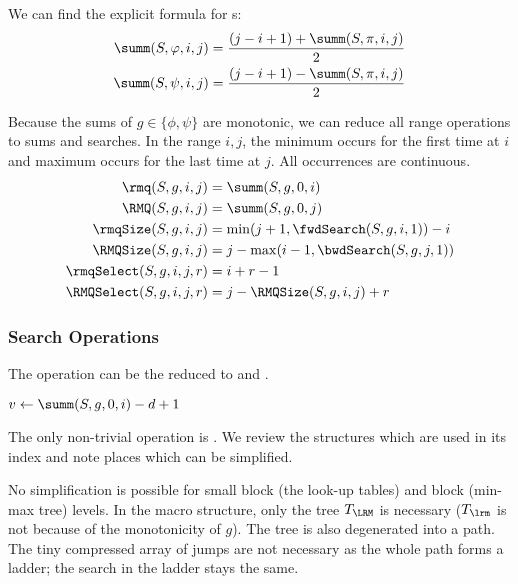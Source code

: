 We can find the explicit formula for \summ{}s:
\begin{align*}
	\summ(S, \phi, i, j) &= \frac{(j - i + 1) + \summ(S, \pi, i, j)}{2} \\
	\summ(S, \psi, i, j) &= \frac{(j - i + 1) - \summ(S, \pi, i, j)}{2}
\end{align*}

Because the sums of $g \in \{\phi, \psi \}$ are monotonic, we can reduce all range operations to sums and searches.
In the range $i, j$, the minimum occurs for the first time at $i$ and maximum occurs for the last time at $j$.
All occurrences are continuous.
\begin{align*}
	\rmq(S, g, i, j) &= \summ(S, g, 0, i) \\
	\RMQ(S, g, i, j) &= \summ(S, g, 0, j) \\
	\rmqSize(S, g, i, j) &= \min(j + 1, \fwdSearch(S, g, i, 1)) - i \\
	\RMQSize(S, g, i, j) &= j - \max(i - 1, \bwdSearch(S, g, j, 1)) \\
	\rmqSelect(S, g, i, j, r) &= i + r - 1 \\ 
	\RMQSelect(S, g, i, j, r) &= j - \RMQSize(S, g, i, j) + r
\end{align*}

\subsubsection{Search Operations}

The operation \bwdSearch{} can be the reduced to \fwdSearch{} and \summ{}.

\begin{algorithm}
\begin{algorithmic}
		\State $v \gets \summ(S, g, 0, i) - d + 1$
			\State {}
			\State {}
		\Else
			\State {}
		\EndIf
		\State {}
	\Else
		\State {}
	\EndIf
\EndFunction
\end{algorithmic}
\end{algorithm}

The only non-trivial operation is \fwdSearch{}.
We review the structures which are used in its index and note places which can be simplified.

No simplification is possible for small block (the look-up tables) and block (min-max tree) levels.
In the macro structure, only the tree $T_{\LRM}$ is necessary ($T_{\lrm}$ is not because of the monotonicity of $g$).
The tree is also degenerated into a path.
The tiny compressed array of jumps are not necessary as the whole path forms a ladder; the search in the ladder stays the same.

